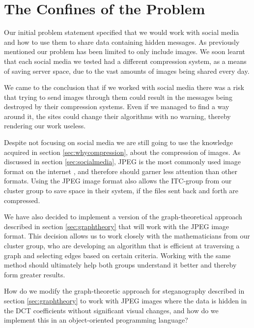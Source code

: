 \section{The Confines of the Problem}
\label{sec:confines}
Our initial problem statement specified that we would work with social media and how to use them to share data containing hidden messages.
As previously mentioned our problem has been limited to only include images.
We soon learnt that each social media we tested had a different compression system, as a means of saving server space, due to the vast amounts of images being shared every day.

We came to the conclusion that if we worked with social media there was a risk that trying to send images through them could result in the messages being destroyed by their compression systems.
Even if we managed to find a way around it, the sites could change their algorithms with no warning, thereby rendering our work useless.

Despite not focusing on social media we are still going to use the knowledge acquired in section \ref{sec:whycompression}, about the compression of images.
As discussed in section \ref{sec:socialmedia}, JPEG is the most commonly used image format on the internet \citep{JPEGMarketShare}, and therefore should garner less attention than other formats.
Using the JPEG image format also allows the ITC-group from our cluster group to save space in their system, if the files sent back and forth are compressed.

We have also decided to implement a version of the graph-theoretical approach described in section \ref{sec:graphtheory} that will work with the JPEG image format.
This decision allows us to work closely with the mathematicians from our cluster group, who are developing an algorithm that is efficient at traversing a graph and selecting edges based on certain criteria.
Working with the same method should ultimately help both groups understand it better and thereby form greater results.

\vspace{5mm}
\begin{centering}
	\begin{tcolorbox}[center title, title=Problem Statement, width=.8\textwidth]
How do we modify the graph-theoretic approach for steganography described in section \ref{sec:graphtheory} to work with JPEG images where the data is hidden in the DCT coefficients without significant visual changes, and how do we implement this in an object-oriented programming language?
	\end{tcolorbox}
\end{centering}

